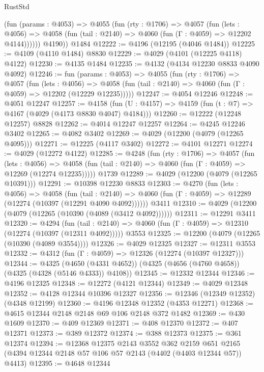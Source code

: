 \begin{lexlean}{RustStd}
\begin{coremodule}
          (fun (params : @4053) =>
          @4055
            (fun (rty : @1706) =>
            @4057
              (fun (lets : @4056) =>
              @4058 (fun (tail : @2140) => @4060 (fun (Γ : @4059) => @12202 @4144))))))
        @4190))
    @1484
@12222 := @4196 (@12195 (@4046 @1484))
@12225 := @4109 (@4110 @1484) @8830
@12229 := @4029 (@4101 (@12225 @4118) @4122)
@12230 := @4135 @1484
@12235 := @4132 (@4134 @12230 @8833 @4090 @4092)
@12246 := fun (params : @4053) =>
  @4055
    (fun (rty : @1706) =>
    @4057
      (fun (lets : @4056) =>
      @4058 (fun (tail : @2140) => @4060 (fun (Γ : @4059) => @12202 (@12229 @12235)))))
@12247 := @4054 @12246
@12248 := @4051 @12247
@12257 := @4158 (fun (U : @4157) => @4159 (fun (t : @7) => @4167 (@4029 (@4173 @8830 @4047) @4184)))
@12260 := @12222 (@12248 @12257) @8828
@12262 := @4014 @12247 @12257
@12264 := @4245 @12246 @3402
@12265 := @4082 @3402
@12269 := @4029 (@12200 (@4079 (@12265 @4095)))
@12271 := @12225 (@4117 @3402)
@12272 := @4101 @12271
@12274 := @4029 (@12272 @4122)
@12285 := @4248
    (fun (rty : @1706) =>
    @4057
      (fun (lets : @4056) =>
      @4058 (fun (tail : @2140) => @4060 (fun (Γ : @4059) => @12269 (@12274 @12235)))))
    @1739
@12289 := @4029 (@12200 (@4079 (@12265 @10391)))
@12291 := @10398 @12230 @8833
@12303 := @4270
    (fun (lets : @4056) =>
    @4058
      (fun (tail : @2140) =>
      @4060 (fun (Γ : @4059) => @12289 (@12274 (@10397 (@12291 @4090 @4092))))))
    @3411
@12310 := @4029 (@12200 (@4079 (@12265 (@10390 (@4089 (@3412 @4092))))))
@12311 := @12291 @3411
@12320 := @4294
    (fun (tail : @2140) => @4060 (fun (Γ : @4059) => @12310 (@12274 (@10397 (@12311 @4092)))))
    @3553
@12325 := @12200 (@4079 (@12265 (@10390 (@4089 @3554))))
@12326 := @4029 @12325
@12327 := @12311 @3553
@12332 := @4312 (fun (Γ : @4059) => @12326 (@12274 (@10397 @12327)))
@12344 := @4325
    (@4650 (@4331 @4652))
    (@4325 (@4656 (@4760 @4658)) (@4325 (@4328 (@5146 @4333)) @4108))
@12345 := @12332 @12344
@12346 := @4196 @12325
@12348 := @12272 (@4121 @12344)
@12349 := @4029 @12348
@12352 := @4128 @12344 @10396 @12327
@12356 := @12346 (@12349 @12352) (@4348 @12199)
@12360 := @4196 @12348 @12352 (@4353 @12271)
@12368 := @4615 @12344 @2148 @2148 @69 @106 @2148 @372 @1482
@12369 := @430 @1609
@12370 := @409 @12369
@12371 := @408 @12370
@12372 := @407 @12371
@12373 := @389 @12372
@12374 := @388 @12373
@12375 := @361 @12374
@12394 := @12368
    @12375
    @2143
    @3552
    @362
    @2159
    @651
    @2165
    (@4394 @12344 @2148 @57 @106 @57 @2143 (@4402 (@4403 @12344 @57)) @4413)
@12395 := @4648 @12344

\end{coremodule}
\end{lexlean}
